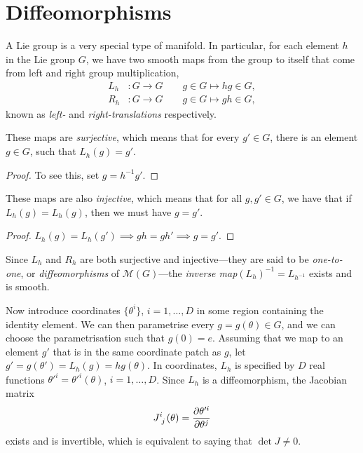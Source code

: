 \section{Diffeomorphisms}%
\label{sec:diffeomorphisms}

A Lie group is a very special type of manifold. In particular, for each element $h$ in the Lie group $G$, we have two smooth maps from the group to itself that come from left and right group multiplication,
\begin{align}
  L_h &\colon G \to G \qquad g \in G \mapsto hg \in G, \\
  R_h &\colon G \to G \qquad g \in G \mapsto gh \in G,
\end{align}
known as \emph{left-} and \emph{right-translations} respectively.

\begin{claim}
  These maps are \emph{surjective}, which means that for every $g' \in G$, there is an element $g \in G$, such that $L_h(g) = g'$. 
\end{claim}
\begin{proof}
  To see this, set $g = h^{-1} g'$.
\end{proof}

\begin{claim}
  These maps are also \emph{injective}, which means that for all $g, g' \in G$, we have that if $L_h(g) = L_h(g)$, then we must have $g = g'$.
\end{claim}
\begin{proof}
  \(
    L_h(g) = L_h(g') \implies gh = gh' \implies g = g'.
    \)
\end{proof}
\begin{definition}[]
  Since $L_h$ and $R_h$ are both surjective and injective---they are said to be \emph{one-to-one}, or \emph{diffeomorphisms} of $\mathcal{M}(G)$---the \emph{inverse map}$(L_h)^{-1} = L_{h^{-1}}$ exists and is smooth.
\end{definition}

\begin{wrapfigure}{L}{0.37\columnwidth}
  \centering
  \def\svgwidth{0.3\columnwidth}
  
  \label{fig:l8f1}
\end{wrapfigure}

Now introduce coordinates $\{ \theta^i \}$, $i = 1, \dots, D$ in some region containing the identity element. We can then parametrise every $g = g(\theta) \in G$, and we can choose the parametrisation such that $g(0) = e$.
Assuming that we map to an element $g'$ that is in the same coordinate patch as $g$, let $g' = g(\theta') = L_h(g) = h g(\theta)$.
In coordinates, $L_h$ is specified by $D$ real functions $\theta'^i = \theta'^i(\theta)$, $i = 1, \dots, D$.
Since $L_h$ is a diffeomorphism, the Jacobian matrix
\begin{equation}
  J \indices{^i_j}(\theta) = \pdv{\theta'^i}{\theta^j}
\end{equation}
exists and is invertible, which is equivalent to saying that $\det J \neq 0$.
